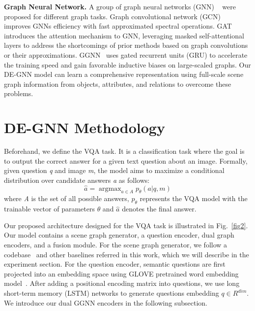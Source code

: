 \documentclass[letterpaper]{article} %
\begin{document}
\vspace{0.05in}
\noindent\textbf{Graph Neural Network.}
A group of graph neural networks (GNN) ~\cite{DBLP:journals/tnn/ScarselliGTHM09,DBLP:conf/cncl/WangGCL16,DBLP:conf/aaai/WangCGL18,DBLP:conf/aistats/SunL19,DBLP:conf/aaai/0001RFHLRG19,DBLP:conf/aaai/LiuCLZLSQ19} were proposed for different graph tasks.
Graph convolutional network (GCN)~\cite{DBLP:conf/iclr/KipfW17} improves GNNs efficiency with fast approximated spectral operations. 
GAT~\cite{DBLP:conf/iclr/VelickovicCCRLB18} introduces the attention mechanism to GNN, leveraging masked self-attentional layers to address the shortcomings of prior methods based on graph convolutions or their approximations. GGNN~\cite{DBLP:journals/corr/LiTBZ15} uses gated recurrent units (GRU) to accelerate the training speed and gain favorable inductive biases on large-scaled graphs.
Our DE-GNN model can learn a comprehensive representation using full-scale scene graph information from objects, attributes, and relations to overcome these problems.


\section{DE-GNN Methodology}

Beforehand, we define the VQA task. 
It is a classification task where the goal is to output the correct answer for a given text question about an image. 
Formally, given question \emph{q} and image \emph{m}, the model aims to maximize a conditional distribution over candidate answers \emph{a} as follows:
\begin{equation}
    \hat{a} = \mathop{\arg\max}_{a \in A}p_\theta(a|q, m)
\end{equation}
where \emph{A} is the set of all possible answers, $p_\theta$ represents the VQA model with the trainable vector of parameters $\theta$ and $\hat{a}$ denotes the final answer.

Our proposed architecture designed for the VQA task is illustrated in Fig.~\ref{fig2}. 
Our model contains a scene graph generator, a question encoder, dual graph encoders, and a fusion module. For the scene graph generator, we follow a codebase~\cite{tang2020sggcode} and other baselines referred in this work, which we will describe in the experiment section. 
For the question encoder, semantic questions are first projected into an embedding space using GLOVE pretrained word embedding model~\cite{pennington-etal-2014-glove}. 
After adding a positional encoding matrix into questions, we use long short-term memory (LSTM) networks to generate questions embedding $q \in R^{dim}$. 
We introduce our dual GGNN encoders in the following subsection.
\end{document}
